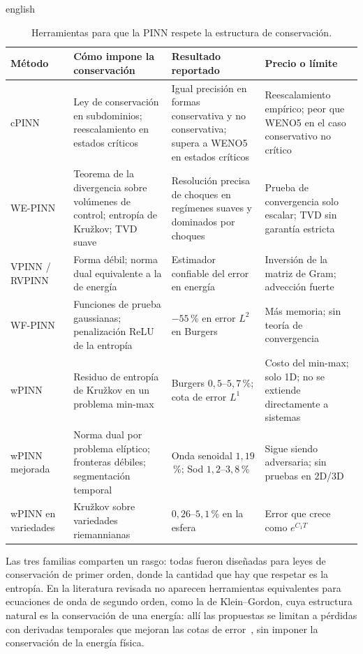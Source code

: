 \documentclass[../0000.tex]{subfiles}
\begin{document}
\begin{hyphenrules}{english}
\begin{table}[htbp]
\centering\small
\caption{Herramientas para que la PINN respete la estructura de conservación.}
\label{tab:ea-cons}
\begin{tabularx}{\textwidth}{@{}l >{\raggedright\arraybackslash}X >{\raggedright\arraybackslash}X >{\raggedright\arraybackslash}X@{}}
\toprule
Método & Cómo impone la conservación & Resultado reportado & Precio o límite \\
\midrule
cPINN~\cite{jagtap2020conservative,quita2023conservative} & Ley de conservación en subdominios; reescalamiento en estados críticos & Igual precisión en formas conservativa y no conservativa; supera a WENO5 en estados críticos & Reescalamiento empírico; peor que WENO5 en el caso conservativo no crítico \\
WE-PINN~\cite{oubarka2026weak} & Teorema de la divergencia sobre volúmenes de control; entropía de Kružkov; TVD suave & Resolución precisa de choques en regímenes suaves y dominados por choques & Prueba de convergencia solo escalar; TVD sin garantía estricta \\
VPINN / RVPINN~\cite{kharazmi2019,rojas2024robust} & Forma débil; norma dual equivalente a la de energía & Estimador confiable del error en energía & Inversión de la matriz de Gram; advección fuerte \\
WF-PINN~\cite{wang2025wf} & Funciones de prueba gaussianas; penalización ReLU de la entropía & $-55$\,\% en error $L^2$ en Burgers & Más memoria; sin teoría de convergencia \\
wPINN~\cite{deryck2024wpinn} & Residuo de entropía de Kružkov en un problema min-max & Burgers $0{,}5$--$5{,}7$\,\%; cota de error $L^1$ & Costo del min-max; solo 1D; no se extiende directamente a sistemas \\
wPINN mejorada~\cite{chaumet2024improving} & Norma dual por problema elíptico; fronteras débiles; segmentación temporal & Onda senoidal $1{,}19$\,\%; Sod $1{,}2$--$3{,}8$\,\% & Sigue siendo adversaria; sin pruebas en 2D/3D \\
wPINN en variedades~\cite{zhou2025weak} & Kružkov sobre variedades riemannianas & $0{,}26$--$5{,}1$\,\% en la esfera & Error que crece como $e^{C_1T}$ \\
\bottomrule
\end{tabularx}
\end{table}

Las tres familias comparten un rasgo: todas fueron diseñadas para leyes de conservación de primer orden, donde la cantidad que hay que respetar es la entropía. En la literatura revisada no aparecen herramientas equivalentes para ecuaciones de onda de segundo orden, como la de Klein--Gordon, cuya estructura natural es la conservación de una energía: allí las propuestas se limitan a pérdidas con derivadas temporales que mejoran las cotas de error~\cite{qian2023}, sin imponer la conservación de la energía física.


\end{hyphenrules}
\end{document}
